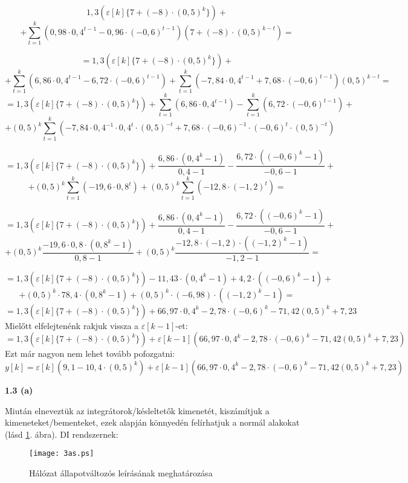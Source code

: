 \documentclass[12pt,a4paper]{article}
\begin{document}
\[1,3\left(\varepsilon[k]\{7 + (-8)\cdot(0,5)^{k}\}\right) + \]
\[+ \sum_{t=1}^{k}\left(0,98\cdot 0,4^{t-1}-0,96\cdot (-0,6)^{t-1}\right)\left(7 + (-8)\cdot(0,5)^{k-t}\right) = \]

\[= 1,3\left(\varepsilon[k]\{7 + (-8)\cdot(0,5)^{k}\}\right) + \]
\[+ \sum_{t=1}^{k}\left(6,86\cdot 0,4^{t-1}-6,72\cdot (-0,6)^{t-1}\right)+ \sum_{t=1}^{k}\left(-7,84\cdot 0,4^{t-1}+7,68\cdot (-0,6)^{t-1}\right)(0,5)^{k-t} = \]
\[= 1,3\left(\varepsilon[k]\{7 + (-8)\cdot(0,5)^{k}\}\right) + \sum_{t=1}^{k}\left(6,86\cdot 0,4^{t-1}\right)-\sum_{t=1}^{k}\left(6,72\cdot (-0,6)^{t-1}\right)+\]
\[+ (0,5)^k\sum_{t=1}^{k}\left(-7,84\cdot 0,4^{-1}\cdot 0,4^{t}\cdot(0,5)^{-t}+7,68\cdot(-0,6)^{-1}\cdot (-0,6)^{t}\cdot(0,5)^{-t}\right)\]

\[= 1,3\left(\varepsilon[k]\{7 + (-8)\cdot(0,5)^{k}\}\right) + \frac{6,86\cdot (0,4^k-1)}{0,4-1}-\frac{6,72\cdot ((-0,6)^k-1)}{-0,6-1}+\]
\[+ (0,5)^k\sum_{t=1}^{k}\left(-19,6\cdot 0,8^{t}\right)+(0,5)^k\sum_{t=1}^{k}\left(-12,8\cdot (-1,2)^{t}\right) = \]

\[= 1,3\left(\varepsilon[k]\{7 + (-8)\cdot(0,5)^{k}\}\right) + \frac{6,86\cdot (0,4^k-1)}{0,4-1}-\frac{6,72\cdot ((-0,6)^k-1)}{-0,6-1}+\]
\[+ (0,5)^k\frac{-19,6\cdot 0,8\cdot (0,8^{k}-1)}{0,8-1}+(0,5)^k\frac{-12,8\cdot (-1,2)\cdot ((-1,2)^{k}-1)}{-1,2-1} = \]

\[= 1,3\left(\varepsilon[k]\{7 + (-8)\cdot(0,5)^{k}\}\right) - 11,43\cdot (0,4^k-1)+4,2\cdot ((-0,6)^k-1)+\]
\[+ (0,5)^k\cdot 78,4\cdot (0,8^{k}-1)+(0,5)^k\cdot (-6,98)\cdot ((-1,2)^{k}-1) = \]
\[= 1,3\left(\varepsilon[k]\{7 + (-8)\cdot(0,5)^{k}\}\right) + 66,97\cdot 0,4^k -2,78\cdot (-0,6)^k - 71,42(0,5)^k + 7,23\]
Mielőtt elfelejtenénk rakjuk vissza a $\varepsilon[k-1]$-et:
\[= 1,3\left(\varepsilon[k]\{7 + (-8)\cdot(0,5)^{k}\}\right) + \varepsilon[k-1]\left(66,97\cdot 0,4^k -2,78\cdot (-0,6)^k - 71,42(0,5)^k + 7,23\right)\]
Ezt már nagyon nem lehet tovább pofozgatni:
\[y[k] = \boxed{\varepsilon[k]\left(9,1 -10,4\cdot(0,5)^{k}\right) + \varepsilon[k-1]\left(66,97\cdot 0,4^k -2,78\cdot (-0,6)^k - 71,42(0,5)^k + 7,23\right)}\]

\textbf{1.3 (a)}

Miután elneveztük az integrátorok/késleltetők kimenetét, kiszámítjuk a kimeneteket/bementeket, ezek alapján könnyedén felírhatjuk a normál alakokat (lásd \ref{fig:halozat}. ábra). DI rendszernek:

\begin{figure}
\begin{center}
\texttt{[image: 3as.ps]}
\caption{Hálózat állapotváltozós leírásának meghatározása}
\label{fig:halozat}
\end{center}
\end{figure}
\end{document}
